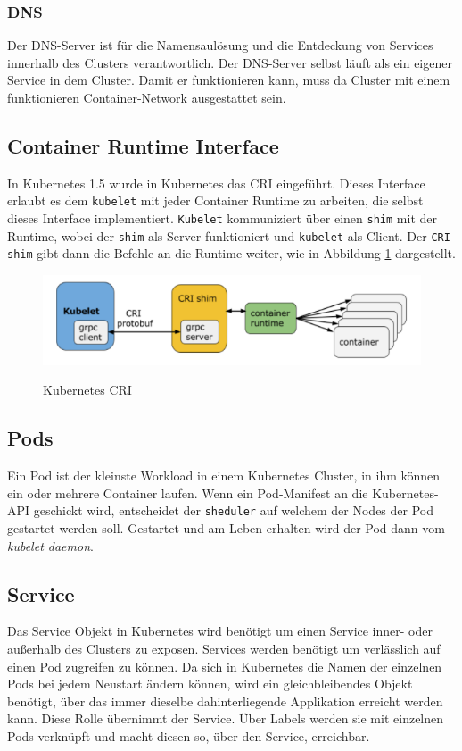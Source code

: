 \subsubsection{DNS}
Der \ac{DNS}-Server ist für die Namensaulösung und die Entdeckung von Services innerhalb des Clusters verantwortlich. 
Der \ac{DNS}-Server selbst läuft als ein eigener Service in dem Cluster.
Damit er funktionieren kann, muss da Cluster mit einem funktionieren Container-Network ausgestattet sein. 
\cite[S.34 f]{Kubernetes_up_and_running}

\subsection{Container Runtime Interface}
In Kubernetes 1.5 wurde in Kubernetes das \ac{CRI} eingeführt.
Dieses Interface erlaubt es dem \texttt{kubelet} mit jeder Container Runtime zu arbeiten, die selbst dieses Interface implementiert. 
\texttt{Kubelet} kommuniziert über einen \texttt{shim} mit der Runtime, wobei der \texttt{shim} als Server funktioniert und \texttt{kubelet} als Client.
Der \texttt{\ac{CRI} shim} gibt dann die Befehle an die Runtime weiter, wie in Abbildung \ref{fig:cri} dargestellt.
\begin{figure}[ht]
        \caption{Kubernetes \ac{CRI}\cite{kubernetes_cri}}
        \centering
        \includegraphics[width=\textwidth]{bilder/kubernetes_cri.png}
        \label{fig:cri}
\end{figure}
\cite{kubernetes_cri}

\subsection{Pods}
Ein Pod ist der kleinste Workload in einem Kubernetes Cluster, in ihm können ein oder mehrere Container laufen.
Wenn ein Pod-Manifest an die Kubernetes-\ac{API} geschickt wird, entscheidet der \texttt{sheduler} auf welchem der Nodes der Pod gestartet werden soll.
Gestartet und am Leben erhalten wird der Pod dann vom \textit{kubelet daemon}.
\cite[S.63]{Kubernetes_up_and_running}

\subsection{Service}
Das Service Objekt in Kubernetes wird benötigt um einen Service inner- oder außerhalb des Clusters zu exposen.
Services werden benötigt um verlässlich auf einen Pod zugreifen zu können.
Da sich in Kubernetes die Namen der einzelnen Pods bei jedem Neustart ändern können, wird ein gleichbleibendes Objekt benötigt, über das immer dieselbe dahinterliegende Applikation erreicht werden kann.
Diese Rolle übernimmt der Service.
Über Labels werden sie mit einzelnen Pods verknüpft und macht diesen so, über den Service, erreichbar.
\cite[S.86]{Kubernetes_up_and_running}

